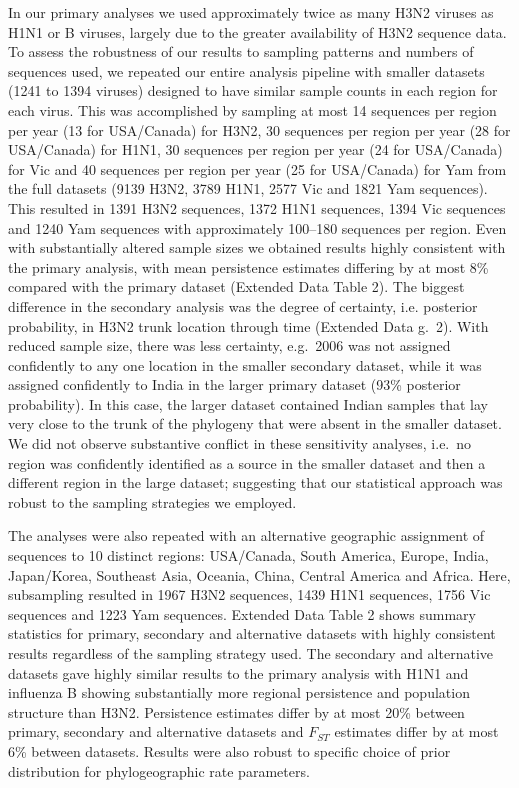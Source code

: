 \documentclass[11pt,oneside,letterpaper]{article}
\begin{document}
In our primary analyses we used approximately twice as many H3N2 viruses as H1N1 or B viruses, largely due to the greater availability of H3N2 sequence data.
To assess the robustness of our results to sampling patterns and numbers of sequences used, we repeated our entire analysis pipeline with smaller datasets (1241 to 1394 viruses) designed to have similar sample counts in each region for each virus.
This was accomplished by sampling at most 14 sequences per region per year (13 for USA/Canada) for H3N2, 30 sequences per region per year (28 for USA/Canada) for H1N1, 30 sequences per region per year (24 for USA/Canada) for Vic and 40 sequences per region per year (25 for USA/Canada) for Yam from the full datasets (9139 H3N2, 3789 H1N1, 2577 Vic and 1821 Yam sequences). 
This resulted in 1391 H3N2 sequences, 1372 H1N1 sequences, 1394 Vic sequences and 1240 Yam sequences with approximately 100--180 sequences per region.
Even with substantially altered sample sizes we obtained results highly consistent with the primary analysis, with mean persistence estimates differing by at most 8\% compared with the primary dataset (Extended Data Table 2).
The biggest difference in the secondary analysis was the degree of certainty, i.e. posterior probability, in H3N2 trunk location through time (Extended Data g.~2).
With reduced sample size, there was less certainty, e.g.\ 2006 was not assigned confidently to any one location in the smaller secondary dataset, while it was assigned confidently to India in the larger primary dataset (93\% posterior probability).
In this case, the larger dataset contained Indian samples that lay very close to the trunk of the phylogeny that were absent in the smaller dataset.
We did not observe substantive conflict in these sensitivity analyses, i.e.\ no region was confidently identified as a source in the smaller dataset and then a different region in the large dataset; suggesting that our statistical approach was robust to the sampling strategies we employed.

The analyses were also repeated with an alternative geographic assignment of sequences to 10 distinct regions: USA/Canada, South America, Europe, India, Japan/Korea, Southeast Asia, Oceania, China, Central America and Africa.
Here, subsampling resulted in 1967 H3N2 sequences, 1439 H1N1 sequences, 1756 Vic sequences and 1223 Yam sequences.
Extended Data Table 2 shows summary statistics for primary, secondary and alternative datasets with highly consistent results regardless of the sampling strategy used.
The secondary and alternative datasets gave highly similar results to the primary analysis with H1N1 and influenza B showing substantially more regional persistence and population structure than H3N2.
Persistence estimates differ by at most 20\% between primary, secondary and alternative datasets and $F_{ST}$ estimates differ by at most 6\% between datasets.
Results were also robust to specific choice of prior distribution for phylogeographic rate parameters.
\end{document}

